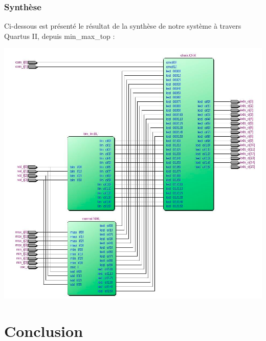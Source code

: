 \subsubsection{Synthèse}
Ci-dessous est présenté le résultat de la synthèse de notre système à travers Quartus II, depuis min\_max\_top :
\begin{minipage}{\textwidth}
	\center
	\includegraphics[scale=0.5]{figures/min_max_top.png}
    	\end{minipage}






\section{Conclusion}

